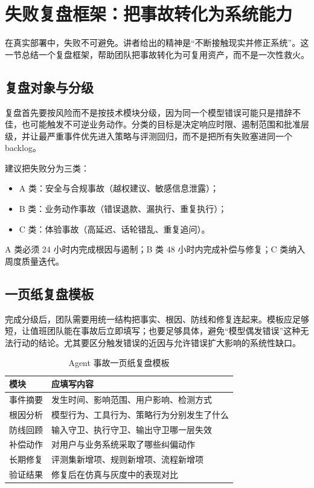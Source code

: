 \section{失败复盘框架：把事故转化为系统能力}

在真实部署中，失败不可避免。讲者给出的精神是“不断接触现实并修正系统”。这一节总结一个复盘框架，帮助团队把事故转化为可复用资产，而不是一次性救火。

\subsection{复盘对象与分级}

复盘首先要按风险而不是按技术模块分级，因为同一个模型错误可能只是措辞不佳，也可能触发不可逆业务动作。分类的目标是决定响应时限、遏制范围和批准层级，并让最严重事件优先进入策略与评测回归，而不是把所有失败塞进同一个 backlog。

建议把失败分为三类：
\begin{itemize}[leftmargin=1.5em]
    \item A 类：安全与合规事故（越权建议、敏感信息泄露）；
    \item B 类：业务动作事故（错误退款、漏执行、重复执行）；
    \item C 类：体验事故（高延迟、话轮错乱、重复追问）。
\end{itemize}
A 类必须 24 小时内完成根因与遏制；B 类 48 小时内完成补偿与修复；C 类纳入周度质量迭代。

\subsection{一页纸复盘模板}

完成分级后，团队需要用统一结构把事实、根因、防线和修复连起来。模板应足够短，让值班团队能在事故后立即填写；也要足够具体，避免“模型偶发错误”这种无法行动的结论。尤其要区分触发错误的近因与允许错误扩大影响的系统性缺口。

\begin{table}[H]
\centering
\caption{Agent 事故一页纸复盘模板}
\begin{tabularx}{\textwidth}{>{\raggedright\arraybackslash}p{3cm} >{\raggedright\arraybackslash}X}
\toprule
模块 & 应填写内容 \\
\midrule
事件摘要 & 发生时间、影响范围、用户影响、检测方式 \\
根因分析 & 模型行为、工具行为、策略行为分别发生了什么 \\
防线回顾 & 输入守卫、执行守卫、输出守卫哪一层失效 \\
补偿动作 & 对用户与业务系统采取了哪些纠偏动作 \\
长期修复 & 评测集新增项、规则新增项、流程新增项 \\
验证结果 & 修复后在仿真与灰度中的表现对比 \\
\bottomrule
\end{tabularx}
\end{table}

